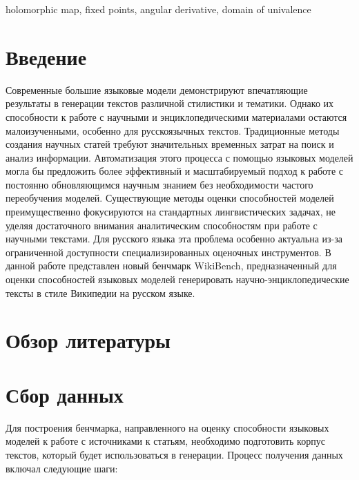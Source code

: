 \documentclass{article}
\theoremstyle{definition}
\theoremstyle{plain}
\begin{document}
\begin{altkeywords}
holomorphic map, fixed points, angular derivative, domain of univalence
\end{altkeywords}

\section*{Введение}

Современные большие языковые модели демонстрируют впечатляющие результаты в генерации текстов различной стилистики и тематики. 
Однако их способности к работе с научными и энциклопедическими материалами остаются малоизученными, особенно для русскоязычных текстов. 
Традиционные методы создания научных статей требуют значительных временных затрат на поиск и анализ информации. 
Автоматизация этого процесса с помощью языковых моделей могла бы предложить более эффективный и масштабируемый подход к работе с постоянно обновляющимся научным знанием без необходимости частого переобучения моделей.
Существующие методы оценки способностей моделей преимущественно фокусируются на стандартных лингвистических задачах, не уделяя достаточного внимания аналитическим способностям при работе с научными текстами.
Для русского языка эта проблема особенно актуальна из-за ограниченной доступности специализированных оценочных инструментов.
В данной работе представлен новый бенчмарк WikiBench, предназначенный для оценки способностей языковых моделей генерировать научно-энциклопедические тексты в стиле Википедии на русском языке. 

\section*{Обзор литературы}
\section*{Сбор данных}

Для построения бенчмарка, направленного на оценку способности языковых моделей к работе с источниками к статьям, необходимо подготовить корпус текстов, который будет использоваться в генерации. Процесс получения данных включал следующие шаги:
\end{document}
